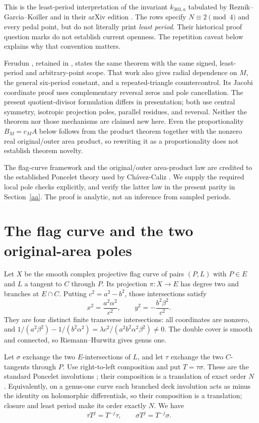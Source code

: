 \documentclass[11pt]{article}
\newcommand{\pp}{\pi}
\begin{document}
This is the least-period interpretation of the invariant \(k_{303,a}\)
tabulated by Reznik--Garcia--Koiller \cite[Section 3.4, Table 4]{rgk}
and in their arXiv edition \cite[Table 4, p.~6]{rgkarxiv}.
The rows specify \(N\equiv2\pmod4\) and every pedal point, but do not
literally print \emph{least period}. Their historical proof question marks
do not establish current openness. The repetition caveat below explains
why that convention matters.

Ferudun \cite[Theorem 1]{ferudun10}, retained in \cite{ferudun11}, states
the same theorem with the same signed, least-period and arbitrary-point
scope. That work also gives radial dependence on \(M\), the general
six-period constant, and a repeated-triangle countercontrol. Its Jacobi
coordinate proof uses complementary reversal zeros and pole cancellation.
The present quotient-divisor formulation differs in presentation; both
use central symmetry, isotropic projection poles, parallel residues, and
reversal. Neither the theorem nor those mechanisms are claimed new here.
Even the proportionality \(B_M=c_M A\) below follows from the product
theorem together with the nonzero real original/outer area product, so
rewriting it as a proportionality does not establish theorem novelty.

The flag-curve framework and the original/outer area-product law are
credited to the established Poncelet theory used by Ch\'avez-Caliz
\cite[Section 2 and Theorems 3, 6]{chavez}. We supply the required local
pole checks explicitly, and verify the latter law in the present parity
in Section~\ref{aa}. The proof is analytic, not an inference from sampled
periods.

\section{The flag curve and the two original-area poles}
Let \(X\) be the smooth complex projective flag curve of pairs \((P,L)\)
with \(P\in E\) and \(L\) a tangent to \(C\) through \(P\).
Its projection \(\pp:X\to E\) has degree two and branches at \(E\cap C\).
Putting \(c^2=a^2-b^2\), those intersections satisfy
\[
 x^2=\frac{a^2\alpha^2}{c^2},\qquad
 y^2=-\frac{b^2\beta^2}{c^2}.
\]
They are four distinct finite transverse intersections: all coordinates
are nonzero, and
\(1/(a^2\beta^2)-1/(b^2\alpha^2)
=\lambda c^2/(a^2b^2\alpha^2\beta^2)\ne0\).
The double cover is smooth and connected, so Riemann--Hurwitz gives
genus one.

Let \(\sigma\) exchange the two \(E\)-intersections of \(L\), and let
\(\tau\) exchange the two \(C\)-tangents through \(P\).
Use right-to-left composition and put \(T=\tau\sigma\). These are the
standard Poncelet involutions \cite[Section 2]{chavez}; their composition
is a translation of exact order \(N\). Equivalently, on a genus-one curve
each branched deck involution acts as minus the identity on holomorphic
differentials, so their composition is a translation; closure and least
period make its order exactly \(N\). We have
\[
 \tau T^j=T^{-j}\tau,\qquad \sigma T^j=T^{-j}\sigma .
\]
\end{document}
